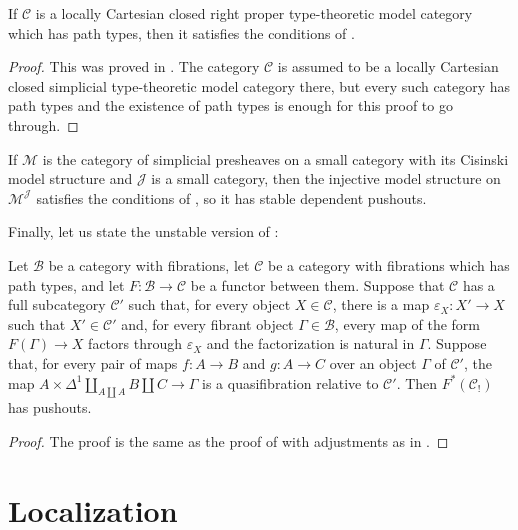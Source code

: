 \documentclass[reqno]{amsart}
\theoremstyle{definition}
\theoremstyle{remark}
\newcommand{\scat}[1]{\mathcal{#1}}
\numberwithin{figure}{section}
\begin{document}
\begin{lem}
If $\scat{C}$ is a locally Cartesian closed right proper type-theoretic model category which has path types, then it satisfies the conditions of .
\end{lem}
\begin{proof}
This was proved in \cite[Theorem~4.2]{lum-shul-hits}.
The category $\scat{C}$ is assumed to be a locally Cartesian closed simplicial type-theoretic model category there, but every such category has path types and the existence of path types is enough for this proof to go through.
\end{proof}

\begin{example}
If $\scat{M}$ is the category of simplicial presheaves on a small category with its Cisinski model structure \cite{cisinski-presheaf,cisinski} and $\scat{J}$ is a small category,
then the injective model structure on $\scat{M}^\scat{J}$ satisfies the conditions of , so it has stable dependent pushouts.
\end{example}

Finally, let us state the unstable version of :

\begin{lem}
Let $\scat{B}$ be a category with fibrations, let $\scat{C}$ be a category with fibrations which has path types, and let $F : \scat{B} \to \scat{C}$ be a functor between them.
Suppose that $\scat{C}$ has a full subcategory $\scat{C}'$ such that, for every object $X \in \scat{C}$, there is a map $\varepsilon_X : X' \to X$ such that $X' \in \scat{C}'$ and,
for every fibrant object $\Gamma \in \scat{B}$, every map of the form $F(\Gamma) \to X$ factors through $\varepsilon_X$ and the factorization is natural in $\Gamma$.
Suppose that, for every pair of maps $f : A \to B$ and $g : A \to C$ over an object $\Gamma$ of $\scat{C}'$, the map $A \times \Delta^1 \amalg_{A \amalg A} B \amalg C \to \Gamma$ is a quasifibration relative to $\scat{C}'$.
Then $F^*(\scat{C}_!)$ has pushouts.
\end{lem}
\begin{proof}
The proof is the same as the proof of  with adjustments as in .
\end{proof}

\section{Localization}
\label{sec:loc}
\end{document}
